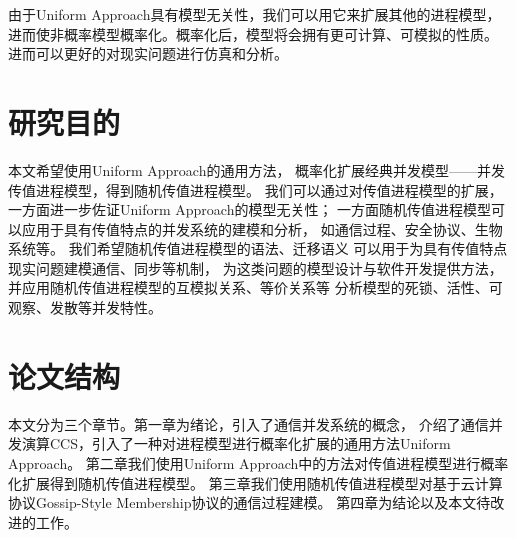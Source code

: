    由于Uniform Approach具有模型无关性，我们可以用它来扩展其他的进程模型，
   进而使非概率模型概率化。概率化后，模型将会拥有更可计算、可模拟的性质。
   进而可以更好的对现实问题进行仿真和分析。

\section{研究目的}
本文希望使用Uniform Approach的通用方法，
概率化扩展经典并发模型——并发传值进程模型，得到随机传值进程模型。
我们可以通过对传值进程模型的扩展，
一方面进一步佐证Uniform Approach的模型无关性；
一方面随机传值进程模型可以应用于具有传值特点的并发系统的建模和分析，
如通信过程、安全协议、生物系统等。
我们希望随机传值进程模型的语法、迁移语义
可以用于为具有传值特点现实问题建模通信、同步等机制，
为这类问题的模型设计与软件开发提供方法，
并应用随机传值进程模型的互模拟关系、等价关系等
分析模型的死锁、活性、可观察、发散等并发特性。

\section{论文结构}
本文分为三个章节。第一章为绪论，引入了通信并发系统的概念，
介绍了通信并发演算CCS，引入了一种对进程模型进行概率化扩展的通用方法Uniform Approach。
第二章我们使用Uniform Approach中的方法对传值进程模型进行概率化扩展得到随机传值进程模型。
第三章我们使用随机传值进程模型对基于云计算协议Gossip-Style Membership协议的通信过程建模。
第四章为结论以及本文待改进的工作。
